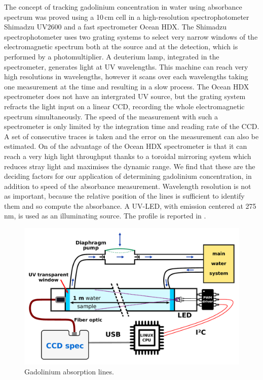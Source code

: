 The concept of tracking gadolinium concentration in water using absorbance spectrum %
was proved using a 10\,cm cell in a high-resolution spectrophotometer Shimadzu UV2600 %
and a fast spectrometer Ocean HDX.
The Shimadzu spectrophotometer uses two grating systems to select very narrow windows of the electromagnetic spectrum %
both at the source and at the detection, which is performed by a photomultiplier.
A deuterium lamp, integrated in the spectrometer, generates light at UV wavelengths.
This machine can reach very high resolutions in wavelengths, however it scans over each wavelengths %
taking one measurement at the time and resulting in a slow process.
The Ocean HDX spectrometer does not have an intergrated UV source, %
but the grating system refracts the light input on a linear CCD, recording the whole %
electromagnetic spectrum simultaneously.
The speed of the measurement with such a spectrometer is only limited by the integration time %
and reading rate of the CCD.
A set of consecutive traces is taken and the error on the measurement can also be estimated.
On of the advantage of the Ocean HDX spectrometer is that it can reach a very high light throughput %
thanks to a toroidal mirroring system which reduces stray light and maximises the dynamic range.
We find that these are the deciding factors for our application of determining gadolinium concentration, %
in addition to speed of the absorbance measurement.
Wavelength resolution is not as important, because the relative position of the lines is sufficient %
to identify them and so compute the absorbance.
A UV-LED, with emission centered at 275\,nm, is used as an illuminating source.
The profile is reported in .

\begin{figure}
	\centering
	\includegraphics[width=0.5\linewidth]{pics/Device.pdf}
	\caption{Gadolinium absorption lines.}
	\label{fig:gad_1m}
\end{figure}

